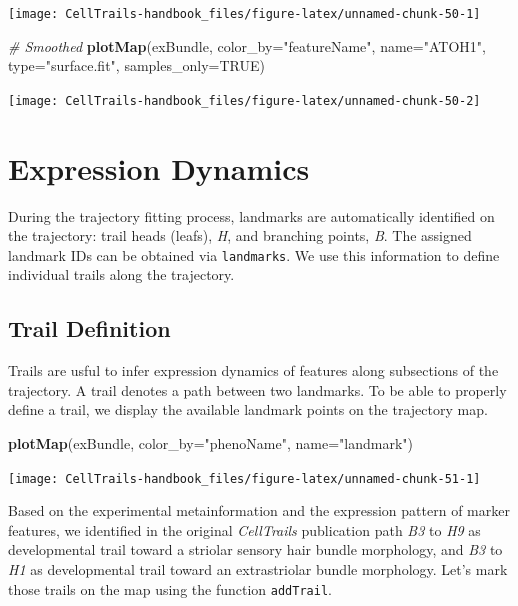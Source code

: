 \documentclass[]{book}
\newenvironment{Shaded}{\begin{snugshade}}{\end{snugshade}}
\newcommand{\KeywordTok}[1]{\textcolor[rgb]{0.13,0.29,0.53}{\textbf{#1}}}
\newcommand{\DataTypeTok}[1]{\textcolor[rgb]{0.13,0.29,0.53}{#1}}
\newcommand{\StringTok}[1]{\textcolor[rgb]{0.31,0.60,0.02}{#1}}
\newcommand{\CommentTok}[1]{\textcolor[rgb]{0.56,0.35,0.01}{\textit{#1}}}
\newcommand{\OtherTok}[1]{\textcolor[rgb]{0.56,0.35,0.01}{#1}}
\newcommand{\NormalTok}[1]{#1}
\theoremstyle{definition}
\theoremstyle{definition}
\theoremstyle{definition}
\theoremstyle{remark}
\begin{document}
\texttt{[image: CellTrails-handbook\_files/figure-latex/unnamed-chunk-50-1]}

\begin{Shaded}
\begin{Highlighting}[]
\CommentTok{# Smoothed}
\KeywordTok{plotMap}\NormalTok{(exBundle, }\DataTypeTok{color_by=}\StringTok{"featureName"}\NormalTok{, }\DataTypeTok{name=}\StringTok{"ATOH1"}\NormalTok{, }\DataTypeTok{type=}\StringTok{"surface.fit"}\NormalTok{, }
        \DataTypeTok{samples_only=}\OtherTok{TRUE}\NormalTok{)}
\end{Highlighting}
\end{Shaded}

\texttt{[image: CellTrails-handbook\_files/figure-latex/unnamed-chunk-50-2]}

\chapter{Expression Dynamics}\label{expression-dynamics}

During the trajectory fitting process, landmarks are automatically
identified on the trajectory: trail heads (leafs), \emph{H}, and
branching points, \emph{B}. The assigned landmark IDs can be obtained
via \texttt{landmarks}. We use this information to define individual
trails along the trajectory.

\section{Trail Definition}\label{trail-definition}

Trails are usful to infer expression dynamics of features along
subsections of the trajectory. A trail denotes a path between two
landmarks. To be able to properly define a trail, we display the
available landmark points on the trajectory map.

\begin{Shaded}
\begin{Highlighting}[]
\KeywordTok{plotMap}\NormalTok{(exBundle, }\DataTypeTok{color_by=}\StringTok{"phenoName"}\NormalTok{, }\DataTypeTok{name=}\StringTok{"landmark"}\NormalTok{)}
\end{Highlighting}
\end{Shaded}

\texttt{[image: CellTrails-handbook\_files/figure-latex/unnamed-chunk-51-1]}

Based on the experimental metainformation and the expression pattern of
marker features, we identified in the original \emph{CellTrails}
publication path \emph{B3} to \emph{H9} as developmental trail toward a
striolar sensory hair bundle morphology, and \emph{B3} to \emph{H1} as
developmental trail toward an extrastriolar bundle morphology. Let's
mark those trails on the map using the function \texttt{addTrail}.
\end{document}
